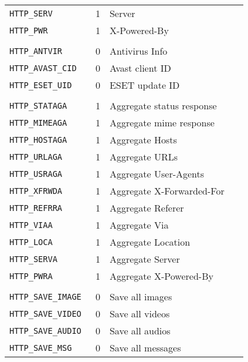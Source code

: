 \documentclass[documentation]{subfiles}
\begin{document}
\begin{longtable}{>{\tt}lcl>{\tt\small}l}
    HTTP\_SERV           & 1 & Server                                          & \\
    HTTP\_PWR            & 1 & X-Powered-By                                    & \\
    \\
    HTTP\_ANTVIR         & 0 & Antivirus Info                                  & \\
    HTTP\_AVAST\_CID     & 0 & Avast client ID                                 & \\
    HTTP\_ESET\_UID      & 0 & ESET update ID                                  & \\
    \\
    HTTP\_STATAGA        & 1 & Aggregate status response                       & \\
    HTTP\_MIMEAGA        & 1 & Aggregate mime response                         & \\
    HTTP\_HOSTAGA        & 1 & Aggregate Hosts                                 & \\
    HTTP\_URLAGA         & 1 & Aggregate URLs                                  & \\
    HTTP\_USRAGA         & 1 & Aggregate User-Agents                           & \\
    HTTP\_XFRWDA         & 1 & Aggregate X-Forwarded-For                       & \\
    HTTP\_REFRRA         & 1 & Aggregate Referer                               & \\
    HTTP\_VIAA           & 1 & Aggregate Via                                   & \\
    HTTP\_LOCA           & 1 & Aggregate Location                              & \\
    HTTP\_SERVA          & 1 & Aggregate Server                                & \\
    HTTP\_PWRA           & 1 & Aggregate X-Powered-By                          & \\
    \\
    HTTP\_SAVE\_IMAGE    & 0 & Save all images                                 & \\
    HTTP\_SAVE\_VIDEO    & 0 & Save all videos                                 & \\
    HTTP\_SAVE\_AUDIO    & 0 & Save all audios                                 & \\
    HTTP\_SAVE\_MSG      & 0 & Save all messages                               & \\

\end{longtable}
\end{document}
